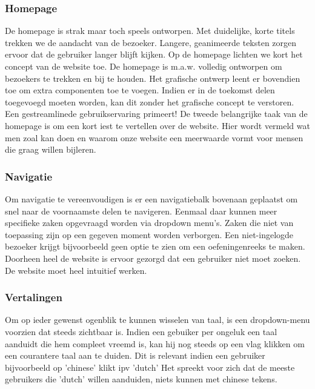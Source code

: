 \subsubsection{Homepage}
De homepage is strak maar toch speels ontworpen. Met duidelijke, korte titels trekken we de aandacht van de bezoeker.
Langere, geanimeerde teksten zorgen ervoor dat de gebruiker langer blijft kijken. Op de homepage lichten we kort het concept
van de website toe. De homepage is m.a.w. volledig ontworpen om bezoekers te trekken en bij te houden. Het grafische ontwerp
leent er bovendien toe om extra componenten toe te voegen. Indien er in de toekomst delen toegevoegd moeten worden, kan dit
zonder het grafische concept te verstoren. Een gestreamlinede gebruikservaring primeert!
De tweede belangrijke taak van de homepage is om een kort iest te vertellen over de website. Hier wordt vermeld wat men zoal
kan doen en waarom onze website een meerwaarde vormt voor mensen die graag willen bijleren.

\subsubsection{Navigatie}
Om navigatie te vereenvoudigen is er een navigatiebalk bovenaan geplaatst om snel naar de voornaamste
delen te navigeren. Eenmaal daar kunnen meer specifieke zaken opgevraagd worden via dropdown menu's.
Zaken die niet van toepassing zijn op een gegeven moment worden verborgen. Een niet-ingelogde bezoeker
krijgt bijvoorbeeld geen optie te zien om een oefeningenreeks te maken. Doorheen heel de website is
ervoor gezorgd dat een gebruiker niet moet zoeken. De website moet heel intuitief werken.

\subsubsection{Vertalingen}
Om op ieder gewenst ogenblik te kunnen wisselen van taal, is een dropdown-menu voorzien dat steeds zichtbaar is.
Indien een gebuiker per ongeluk een taal aanduidt die hem compleet vreemd is, kan hij nog steeds op een vlag klikken
om een courantere taal aan te duiden. Dit is relevant indien een gebruiker bijvoorbeeld op 'chinese' klikt ipv 'dutch'
Het spreekt voor zich dat de meeste gebruikers die 'dutch' willen aanduiden, niets kunnen met chinese tekens.
